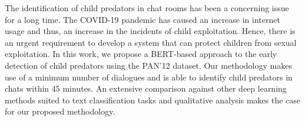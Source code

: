 The identification of child predators in chat rooms has been a concerning issue for a long time. The COVID-19 pandemic has caused an increase in internet usage and thus, an increase in the incidents of child exploitation. Hence, there is an urgent requirement to develop a system that can protect children from sexual exploitation. In this work, we propose a BERT-based approach to the early detection of child predators using the PAN'12 dataset. Our methodology makes use of a minimum number of dialogues and is able to identify child predators in chats within 45 minutes. An extensive comparison against other deep learning methods suited to text classification tasks and qualitative analysis makes the case for our proposed methodology.
